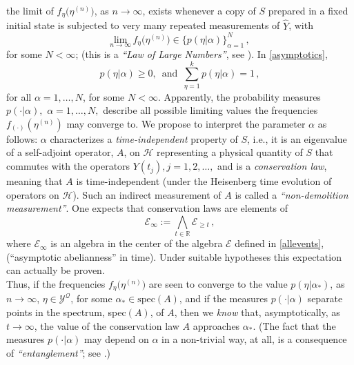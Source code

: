 \documentclass[12pt]{article}
\begin{document}
the limit of $f_{\eta}\big({\eta}^{(n)}\big)$, as $n\rightarrow \infty$, exists whenever a copy of $S$ prepared in a fixed initial state is subjected to very many repeated measurements of $\widehat{Y}$, with
\begin{equation}\label{asymptotics}
\underset{n \rightarrow \infty}{\text{lim}}\, f_{\eta}\big({\eta}^{(n)}\big) \in \lbrace p(\eta\vert \alpha)\rbrace_{\alpha = 1}^{N}\,, 
\end{equation}
for some $N<\infty$; (this is a \textit{``Law of Large Numbers''}, see \cite{BFFS}). In \eqref{asymptotics},
\begin{equation}\label{p}
p(\eta \vert \alpha) \geq 0 , \, \text{   and   }\, \sum_{\eta=1}^{k} p(\eta \vert \alpha) =1\,,
\end{equation}
for all $\alpha=1,\dots, N$, for some $N<\infty$. Apparently, the probability measures $p(\cdot \vert \alpha), $ $\alpha = 1,\dots, N,$ describe all possible limiting values the frequencies $f_{(\cdot)}({\eta}^{(n)})$ may converge to. We propose to interpret the parameter $\alpha$ as follows: $\alpha$ characterizes a \textit{time-independent} property of $S$, i.e., it is an eigenvalue of a self-adjoint operator, $A$, on $\mathcal{H}$ representing a physical quantity of $S$ that commutes with the operators $Y(t_j), j=1,2,\dots,$ and is a 
\textit{conservation law}, meaning that $A$ is time-independent (under the Heisenberg time evolution of operators on 
$\mathcal{H}$). Such an indirect measurement of $A$ is called a \textit{``non-demolition measurement''}. One expects that conservation laws are elements of 
$$\mathcal{E}_{\infty} := \bigwedge_{t\in \mathbb{R}} \mathcal{E}_{\geq t}\,,$$
where $\mathcal{E}_{\infty}$ is an algebra in the center of the algebra $\mathcal{E}$ defined in \eqref{allevents}, (``asymptotic abelianness'' in time). Under suitable hypotheses this expectation can actually be proven. \\
Thus, if the frequencies $f_{\eta}\big({\eta}^{(n)}\big)$ are seen to converge to the value $p(\eta \vert \alpha_{*})$, as $n \rightarrow \infty$, $\eta \in \mathcal{Y}^{\mathcal{Q}}$, for some $\alpha_{*} \in \text{spec}(A)$, and if the measures $p(\cdot\vert \alpha)$ separate points in the spectrum, spec$(A)$, of $A$, then we \textit{know} that, asymptotically, as $t \rightarrow \infty$, the value of the conservation law $A$ approaches $\alpha_{*}$. (The fact that the measures 
$p(\cdot \vert \alpha)$ may depend on $\alpha$ in a non-trivial way, at all, is a consequence of \textit{``entanglement''}; see \cite{Maassen-Kummerer, Bauer-Bernard, BFFS}.)\\
\end{document}
